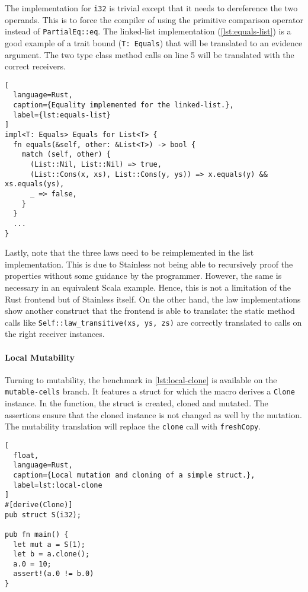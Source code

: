 The implementation for \lstinline!i32! is trivial except that it needs to
dereference the two operands. This is to force the compiler of using the
primitive comparison operator instead of  \lstinline!PartialEq::eq!. The
linked-list implementation (\autoref{lst:equals-list}) is a good example of a
trait bound (\lstinline!T: Equals!) that will be translated to an evidence
argument. The two type class method calls on line 5 will be translated with the
correct receivers.

\begin{lstlisting}[
  language=Rust,
  caption={Equality implemented for the linked-list.},
  label={lst:equals-list}
]
impl<T: Equals> Equals for List<T> {
  fn equals(&self, other: &List<T>) -> bool {
    match (self, other) {
      (List::Nil, List::Nil) => true,
      (List::Cons(x, xs), List::Cons(y, ys)) => x.equals(y) && xs.equals(ys),
      _ => false,
    }
  }
  ...
}
\end{lstlisting}

Lastly, note that the three laws need to be reimplemented in the list
implementation. This is due to Stainless not being able to recursively proof the
properties without some guidance by the programmer. However, the same is
necessary in an equivalent Scala example. Hence, this is not a limitation of the
Rust frontend but of Stainless itself. On the other hand, the law
implementations show another construct that the frontend is able to translate:
the static method calls like \lstinline!Self::law_transitive(xs, ys, zs)! are
correctly translated to calls on the right receiver instances.

\paragraph{Local Mutability}

Turning to mutability, the benchmark in \autoref{lst:local-clone} is available
on the \texttt{mutable-cells} branch. It features a struct for which the macro
derives a \lstinline!Clone! instance. In the function, the struct is created,
cloned and mutated. The assertions ensure that the cloned instance is not
changed as well by the mutation. The mutability translation  will replace the
\lstinline!clone! call with \lstinline!freshCopy!.

\begin{lstlisting}[
  float,
  language=Rust,
  caption={Local mutation and cloning of a simple struct.},
  label=lst:local-clone
]
#[derive(Clone)]
pub struct S(i32);

pub fn main() {
  let mut a = S(1);
  let b = a.clone();
  a.0 = 10;
  assert!(a.0 != b.0)
}
\end{lstlisting}



